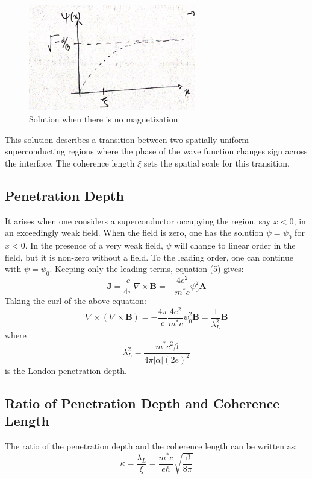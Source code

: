 \documentclass{article}
\begin{document}
\begin{figure}
    \begin{center}
        \includegraphics[width=0.65\textwidth]{figures/7.png}
    \end{center}
    \caption{Solution when there is no magnetization}\label{fig:}
\end{figure}


This solution describes a transition between two spatially uniform superconducting regions where the phase of the wave function changes sign across the interface. The coherence length $\xi$ sets the spatial scale for this transition.

\subsection{Penetration Depth}
It arises when one considers a superconductor occupying the region, say $x < 0$, in an exceedingly weak field. When the field is zero, one has the solution $\psi = \psi_0$ for $x < 0$. In the presence of a very weak field, $\psi$ will change to linear order in the field, but it is non-zero without a field. To the leading order, one can continue with $\psi = \psi_0$. Keeping only the leading terms, equation (5) gives:
\[
\mathbf{J} = \frac{c}{4\pi} \nabla \times \mathbf{B} = -\frac{4e^2}{m^* c} \psi_0^2 \mathbf{A} \tag{8}
\]
Taking the curl of the above equation:
\[
\nabla \times \left( \nabla \times \mathbf{B} \right) = -\frac{4\pi}{c} \frac{4e^2}{m^* c} \psi_0^2 \mathbf{B} = \frac{1}{\lambda_L^2} \mathbf{B} \tag{19}
\]
where
\[
\lambda_L^2 = \frac{m^* c^2 \beta}{4 \pi |\alpha| (2e)^2} \tag{20}
\]
is the London penetration depth.

\subsection{Ratio of Penetration Depth and Coherence Length}
The ratio of the penetration depth and the coherence length can be written as:
\[
\kappa = \frac{\lambda_L}{\xi} = \frac{m^* c}{e\hbar} \sqrt{\frac{\beta}{8\pi}} \tag{21}
\]
\end{document}
